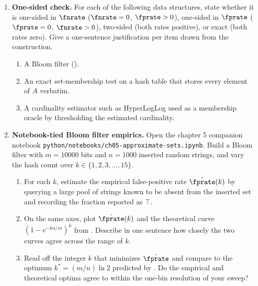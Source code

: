 \begin{enumerate}
\item \exstar
\label{ex:ch5-3}
\textbf{One-sided check.}
For each of the following data structures, state whether it is
one-sided in $\fnrate$ ($\fnrate = 0$, $\fprate > 0$), one-sided in
$\fprate$ ($\fprate = 0$, $\fnrate > 0$), two-sided (both rates
positive), or exact (both rates zero). Give a one-sentence
justification per item drawn from the construction.
\begin{enumerate}
  \item[(a)] A Bloom filter ().
  \item[(b)] An exact set-membership test on a hash table that stores
    every element of $A$ verbatim.
  \item[(c)] A cardinality estimator such as HyperLogLog used as a
    membership oracle by thresholding the estimated cardinality.
\end{enumerate}


\item \exstarstar
\label{ex:ch5-4}
\textbf{Notebook-tied Bloom filter empirics.}
Open the chapter 5 companion notebook
\texttt{python/notebooks/ch05-approximate-sets.ipynb}. Build a Bloom
filter with $m = 10000$ bits and $n = 1000$ inserted random strings,
and vary the hash count over $k \in \{1, 2, 3, \ldots, 15\}$.
\begin{enumerate}
  \item[(a)] For each $k$, estimate the empirical false-positive rate
    $\hat{\fprate}(k)$ by querying a large pool of strings known to be
    absent from the inserted set and recording the fraction reported
    as $\top$.
  \item[(b)] On the same axes, plot $\hat{\fprate}(k)$ and the
    theoretical curve $(1 - e^{-kn/m})^k$ from .
    Describe in one sentence how closely the two curves agree across
    the range of $k$.
  \item[(c)] Read off the integer $k$ that minimizes $\hat{\fprate}$
    and compare to the optimum $k^* = (m/n)\ln 2$ predicted by
    . Do the empirical and theoretical
    optima agree to within the one-bin resolution of your sweep?
\end{enumerate}


\end{enumerate}
